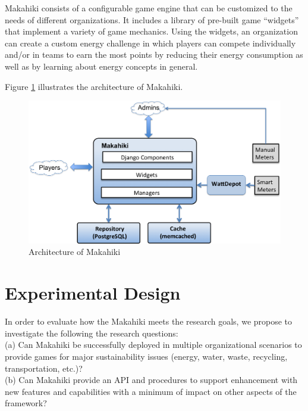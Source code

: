 \documentclass[11pt,final]{article}
\begin{document}
Makahiki consists of a configurable game engine that can be customized to the needs of
different organizations.  It includes a library of pre-built game ``widgets'' that
implement a variety of game mechanics.  Using the widgets, an organization can create a
custom energy challenge in which players can compete individually and/or in teams to earn
the most points by reducing their energy consumption as well as by learning about energy
concepts in general.

Figure \ref{fig:makahiki-architecture} illustrates
the architecture of Makahiki.


\begin{figure}[htbp]
	\centering
		\includegraphics[scale=0.4]{system-architecture.png}
		\caption{Architecture of Makahiki}
	 	\label{fig:makahiki-architecture}
\end{figure}

\section{Experimental Design}

In order to evaluate how the Makahiki meets the research goals, we propose to investigate the following the research questions: \\

	(a) Can Makahiki be successfully deployed in multiple organizational scenarios to provide games for major sustainability issues (energy, water, waste, recycling, transportation, etc.)? \\

	(b) Can Makahiki provide an API and procedures to support enhancement with new features and capabilities with a minimum of impact on other aspects of the framework?\\
      
\end{document}
